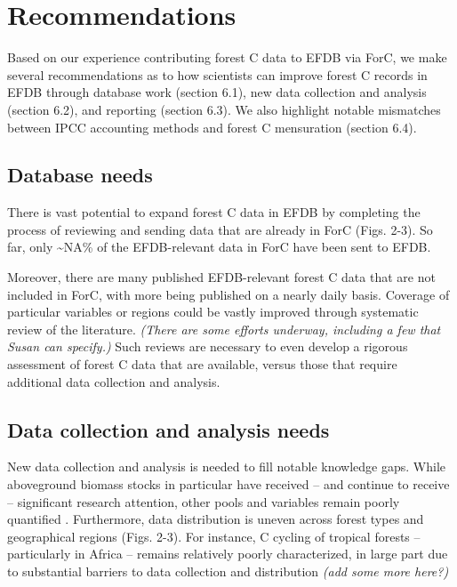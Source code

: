 \documentclass[, manuscript]{copernicus}
\begin{document}
\section{Recommendations}

Based on our experience contributing forest C data to EFDB via ForC, we
make several recommendations as to how scientists can improve forest C
records in EFDB through database work (section 6.1), new data collection
and analysis (section 6.2), and reporting (section 6.3). We also
highlight notable mismatches between IPCC accounting methods and forest
C mensuration (section 6.4).

\subsection{Database needs}

There is vast potential to expand forest C data in EFDB by completing
the process of reviewing and sending data that are already in ForC
(Figs. 2-3). So far, only \textasciitilde NA\% of the EFDB-relevant data
in ForC have been sent to EFDB.

Moreover, there are many published EFDB-relevant forest C data that are
not included in ForC, with more being published on a nearly daily basis.
Coverage of particular variables or regions could be vastly improved
through systematic review of the literature. \emph{(There are some
efforts underway, including a few that Susan can specify.)} Such reviews
are necessary to even develop a rigorous assessment of forest C data
that are available, versus those that require additional data collection
and analysis.

\subsection{Data collection and analysis needs}

New data collection and analysis is needed to fill notable knowledge
gaps. While aboveground biomass stocks in particular have received --
and continue to receive -- significant research attention, other pools
and variables remain poorly quantified \citep[Table
2,][]{anderson-teixeira_carbon_2021}. Furthermore, data distribution is
uneven across forest types and geographical regions (Figs. 2-3). For
instance, C cycling of tropical forests -- particularly in Africa --
remains relatively poorly characterized, in large part due to
substantial barriers to data collection and distribution
\citep{delima_making_2022} \emph{(add some more here?)}
\end{document}
